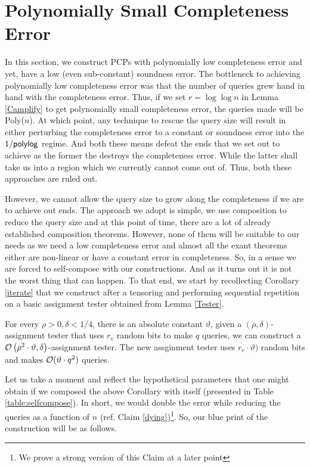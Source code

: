 \chapter{Polynomially Small Completeness Error}\label{section:Iterated}

In this section, we construct PCPs with polynomially low completeness
error and yet, have a low (even sub-constant) soundness error. The bottleneck to
achieving polynomially low completeness error was that the number of
queries grew hand in hand with the completeness error. Thus, if we set
$r = \log \log n$ in Lemma \ref{Camplify} to get polynomially 
small completeness error, the queries made will be
{\sf Poly}($n$). At which point, any technique to rescue the query
size will result in either perturbing the completeness error to a
constant or soundness error into the $1/{\sf polylog}$ regime. And
both these means defeat the ends that we set out to achieve as the
former the destroys the completeness error. While the latter shall
take us into a region which we currently cannot come out of. Thus,
both these approaches are ruled out.

However, we cannot allow the query size to grow along the completeness
if we are to achieve out ends. The approach we adopt is simple, we use
composition to reduce the query size and at this point of time, there
are a lot of already established composition theorems. However, none
of them will be suitable to our needs as we need a low completeness
error and almost all the exant theorems either are non-linear or have
a constant error in completeness. So, in a sense we are forced to
self-compose with our constructions. And as it turns out it is not the
worst thing that can happen. To that end, we start by recollecting
Corollary \ref{iterate} that we construct after a tensoring and
performing sequential repetition on a basic assignment tester obtained from Lemma
\ref{Tester}.

\begin{corollary}
  For every $\rho > 0, \delta < 1/4$, there is an absolute constant $\vartheta$,  given a
$(\rho, \delta)$-assignment tester that uses $r_v$ random bits to make $q$ queries, we can construct a ${\cal O}\left(\rho^2
      \cdot \vartheta , {\delta}\right)$-assignment tester. The new assginment tester 
uses $r_v \cdot  \vartheta)$ random bits and makes ${\cal O}(\vartheta \cdot q^2)$ queries.
 \end{corollary}



 \noindent Let us take a moment and reflect the hypothetical
 parameters that one might obtain if we composed the above Corollary
 with itself (presented in Table \ref{table:selfcompose}). In short, we would double the error while reducing the
 queries as a function of $n$ (ref. Claim \ref{dying})\footnote{We
   prove a strong version of this Claim at a later point}. So, our
 blue print of the construction will be as follows.

